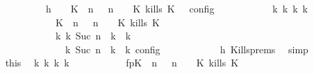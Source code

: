 \begin{isabellebody}
\ \ \ \ \ \ \isamarkupfalse%
\ {\isacharminus}\isanewline
\ \ \ \ \ \ \ \ \isamarkupfalse%
\ h{}{\isacharcolon}\ {\isacartoucheopen}{\isasymrho}\ {\isasymin}\ {\isasymlbrakk}\ {\isacharparenleft}{\isacharparenleft}K\ {\isasymnot}{\isasymUp}\ n{\isacharparenright}\ {\isacharhash}\ {\isasymGamma}{\isacharparenright}{\isacharcomma}\ n\ {\isasymturnstile}\ {\isasymPsi}\ {\isasymtriangleright}\ {\isacharparenleft}{\isacharparenleft}K\ kills\ K\ {\isacharhash}\ {\isasymPhi}{\isacharparenright}\ {\isasymrbrakk}\isactrlsub c\isactrlsub o\isactrlsub n\isactrlsub f\isactrlsub i\isactrlsub g{\isacartoucheclose}\isanewline
\ \ \ \ \ \ \ \ \isamarkupfalse%
\ \isamarkupfalse%
\ {\isacartoucheopen}{\isasymexists}{\isasymGamma}\isactrlsub k\ {\isasymPsi}\isactrlsub k\ {\isasymPhi}\isactrlsub k\ k{\isachardot}\isanewline
\ \ \ \ \ \ \ \ \ \ \ \ \ \ \ \ \ \ \ \ {\isacharparenleft}{\isacharparenleft}{\isacharparenleft}{\isacharparenleft}K\ {\isasymnot}{\isasymUp}\ n{\isacharparenright}\ {\isacharhash}\ {\isasymGamma}{\isacharparenright}{\isacharcomma}\ n\ {\isasymturnstile}\ {\isasymPsi}\ {\isasymtriangleright}\ {\isacharparenleft}{\isacharparenleft}K\ kills\ K\ {\isacharhash}\ {\isasymPhi}{\isacharparenright}{\isacharparenright}\isanewline
\ \ \ \ \ \ \ \ \ \ \ \ \ \ \ \ \ \ \ \ {\isasymhookrightarrow}\isactrlbsup k\isactrlesup \ {\isacharparenleft}{\isasymGamma}\isactrlsub k{\isacharcomma}\ Suc\ n\ {\isasymturnstile}\ {\isasymPsi}\isactrlsub k\ {\isasymtriangleright}\ {\isasymPhi}\isactrlsub k{\isacharparenright}{\isacharparenright}\isanewline
\ \ \ \ \ \ \ \ \ \ \ \ \ \ \ \ \ \ {\isasymand}\ {\isasymrho}\ {\isasymin}\ {\isasymlbrakk}\ {\isasymGamma}\isactrlsub k{\isacharcomma}\ Suc\ n\ {\isasymturnstile}\ {\isasymPsi}\isactrlsub k\ {\isasymtriangleright}\ {\isasymPhi}\isactrlsub k\ {\isasymrbrakk}\isactrlsub c\isactrlsub o\isactrlsub n\isactrlsub f\isactrlsub i\isactrlsub g{\isacartoucheclose}\isanewline
\ \ \ \ \ \ \ \ \ \ \isamarkupfalse%
\ h{}\ Kills{\isachardot}prems\ \isamarkupfalse%
\ simp\isanewline
\ \ \ \ \ \ \ \ \isamarkupfalse%
\ this\ \isamarkupfalse%
\ {\isasymGamma}\isactrlsub k\ {\isasymPsi}\isactrlsub k\ {\isasymPhi}\isactrlsub k\ k\ \isanewline
\ \ \ \ \ \ \ \ \ \ fp{\isacharcolon}{\isacartoucheopen}{\isacharparenleft}{\isacharparenleft}{\isacharparenleft}{\isacharparenleft}K\ {\isasymnot}{\isasymUp}\ n{\isacharparenright}\ {\isacharhash}\ {\isasymGamma}{\isacharparenright}{\isacharcomma}\ n\ {\isasymturnstile}\ {\isasymPsi}\ {\isasymtriangleright}\ {\isacharparenleft}{\isacharparenleft}K\ kills\ K\ {\isacharhash}\ {\isasymPhi}{\isacharparenright}{\isacharparenright}\isanewline

\end{isabellebody}
